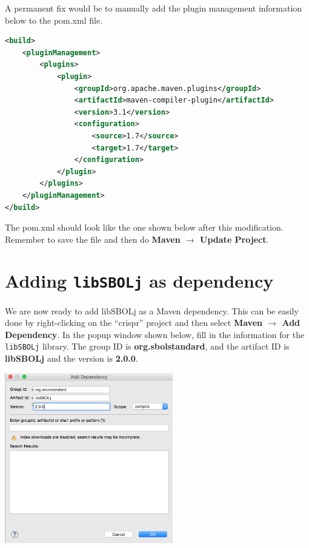 A permanent fix would be to manually add the plugin management information below to the pom.xml file.

\begin{minipage}{\textwidth} 
\begin{lstlisting}[language=xml,basicstyle=\footnotesize\ttfamily]
<build>
    <pluginManagement>
        <plugins>
            <plugin>
                <groupId>org.apache.maven.plugins</groupId>
                <artifactId>maven-compiler-plugin</artifactId>
                <version>3.1</version>
                <configuration>
                    <source>1.7</source>
                    <target>1.7</target>
                </configuration>
            </plugin>
        </plugins>
    </pluginManagement>
</build>
\end{lstlisting}
\end{minipage}

The pom.xml should look like the one shown below after this modification. Remember to save the file and then do {\bf Maven $\rightarrow$  Update Project}.

\begin{minipage}{\textwidth} 

\end{minipage}

\section*{Adding {\tt libSBOLj} as dependency}
We are now ready to add libSBOLj as a Maven dependency. This can be easily done by right-clicking on the ``crispr'' project and then select {\bf Maven $\rightarrow$ Add Dependency}.
In the popup window shown below, fill in the information for the {\tt libSBOLj} library. The group ID is {\bf org.sbolstandard}, and the artifact ID is {\bf libSBOLj} and the version is {\bf 2.0.0}. 
\begin{center}
  \includegraphics[width=0.55\textwidth]{figures/addMavenDependency2}
\end{center}

